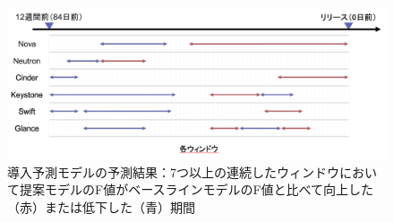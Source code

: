 \documentclass[11pt]{jreport}
\begin{document}


\begin{figure}[t]
\begin{center}
    \includegraphics[width=1.0\textwidth]{Uenaka_fig/RQ1_result/merge_f1_window.pdf}
    \caption{導入予測モデルの予測結果：7つ以上の連続したウィンドウにおいて提案モデルのF値がベースラインモデルのF値と比べて向上した（赤）または低下した（青）期間}
    \label{fig:merge_f1_window}
\end{center}
\end{figure}
\end{document}
